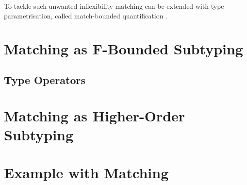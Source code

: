To tackle such unwanted inflexibility matching can be extended
with type parametrisation, called match-bounded quantification
\cite{abadi_subtyping_1996}. 
\section{Matching as F-Bounded Subtyping}
\subsection{Type Operators}


\section{Matching as Higher-Order Subtyping}

\section{Example with Matching}

